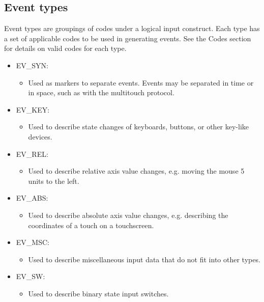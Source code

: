 \documentclass[a4paper,8pt,english]{sphinxmanual}
\begin{document}
\subsection{Event types}
\label{input/event-codes:event-types}
Event types are groupings of codes under a logical input construct. Each
type has a set of applicable codes to be used in generating events. See the
Codes section for details on valid codes for each type.
\begin{itemize}
\item {} 
EV\_SYN:
\begin{itemize}
\item {} 
Used as markers to separate events. Events may be separated in time or in
space, such as with the multitouch protocol.

\end{itemize}

\item {} 
EV\_KEY:
\begin{itemize}
\item {} 
Used to describe state changes of keyboards, buttons, or other key-like
devices.

\end{itemize}

\item {} 
EV\_REL:
\begin{itemize}
\item {} 
Used to describe relative axis value changes, e.g. moving the mouse 5 units
to the left.

\end{itemize}

\item {} 
EV\_ABS:
\begin{itemize}
\item {} 
Used to describe absolute axis value changes, e.g. describing the
coordinates of a touch on a touchscreen.

\end{itemize}

\item {} 
EV\_MSC:
\begin{itemize}
\item {} 
Used to describe miscellaneous input data that do not fit into other types.

\end{itemize}

\item {} 
EV\_SW:
\begin{itemize}
\item {} 
Used to describe binary state input switches.


\end{itemize}
\end{itemize}
\end{document}
